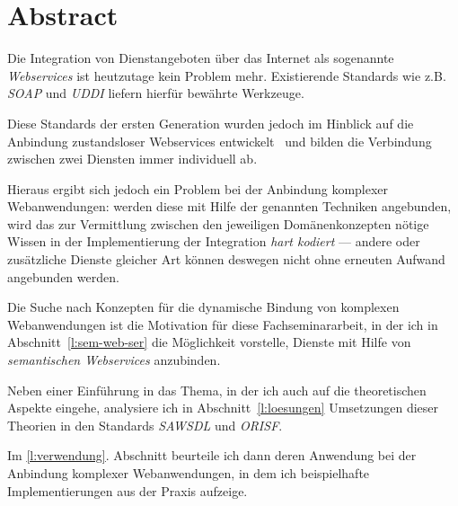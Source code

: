 \section*{Abstract}

Die Integration von Dienstangeboten über das Internet als sogenannte 
\emph{Webservices} ist heutzutage kein Problem mehr. Existierende Standards
wie z.B. \emph{\ac{SOAP}} und \emph{\ac{UDDI}} liefern hierfür bewährte Werkzeuge.

Diese Standards der ersten Generation wurden jedoch im Hinblick auf 
die Anbindung zustandsloser Webservices entwickelt~\cite[S. 653]{ei-sawsdl} 
und bilden die Verbindung zwischen zwei Diensten immer individuell ab.

Hieraus ergibt sich jedoch ein Problem bei der Anbindung komplexer 
Webanwendungen: werden diese mit Hilfe der genannten Techniken 
angebunden, wird das zur Vermittlung zwischen den jeweiligen Domänenkonzepten
nötige Wissen in der Implementierung der Integration \emph{hart kodiert} --- 
andere oder zusätzliche Dienste gleicher Art können deswegen nicht ohne erneuten
Aufwand angebunden werden.

Die Suche nach Konzepten für die dynamische Bindung von komplexen Webanwendungen
ist die Motivation für diese Fachseminararbeit, in der ich in Abschnitt~\ref{l:sem-web-ser} 
die Möglichkeit vorstelle, Dienste mit Hilfe von \emph{semantischen Webservices} 
anzubinden. 

Neben einer Einführung in das Thema, in der ich auch auf die theoretischen Aspekte
eingehe, analysiere ich in Abschnitt~\ref{l:loesungen} Umsetzungen dieser Theorien 
in den Standards \emph{\ac{SAWSDL}} und \emph{\ac{ORISF}}.

Im \ref{l:verwendung}. Abschnitt beurteile ich dann deren Anwendung bei der Anbindung 
komplexer Webanwendungen, in dem ich beispielhafte Implementierungen aus der Praxis aufzeige.

